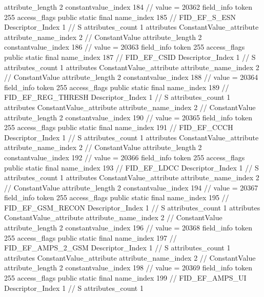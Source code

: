{{{{{{{					attribute_length	2
					constantvalue_index	184		// value = 20362
				}
				}
			}
			field_info {
				token	255
				access_flags	public static final
				name_index	185		// FID_EF_S_ESN
				Descriptor_Index	1		// S
				attributes_count	1
				attributes {
				ConstantValue_attribute {
					attribute_name_index	2		// ConstantValue
					attribute_length	2
					constantvalue_index	186		// value = 20363
				}
				}
			}
			field_info {
				token	255
				access_flags	public static final
				name_index	187		// FID_EF_CSID
				Descriptor_Index	1		// S
				attributes_count	1
				attributes {
				ConstantValue_attribute {
					attribute_name_index	2		// ConstantValue
					attribute_length	2
					constantvalue_index	188		// value = 20364
				}
				}
			}
			field_info {
				token	255
				access_flags	public static final
				name_index	189		// FID_EF_REG_THRESH
				Descriptor_Index	1		// S
				attributes_count	1
				attributes {
				ConstantValue_attribute {
					attribute_name_index	2		// ConstantValue
					attribute_length	2
					constantvalue_index	190		// value = 20365
				}
				}
			}
			field_info {
				token	255
				access_flags	public static final
				name_index	191		// FID_EF_CCCH
				Descriptor_Index	1		// S
				attributes_count	1
				attributes {
				ConstantValue_attribute {
					attribute_name_index	2		// ConstantValue
					attribute_length	2
					constantvalue_index	192		// value = 20366
				}
				}
			}
			field_info {
				token	255
				access_flags	public static final
				name_index	193		// FID_EF_LDCC
				Descriptor_Index	1		// S
				attributes_count	1
				attributes {
				ConstantValue_attribute {
					attribute_name_index	2		// ConstantValue
					attribute_length	2
					constantvalue_index	194		// value = 20367
				}
				}
			}
			field_info {
				token	255
				access_flags	public static final
				name_index	195		// FID_EF_GSM_RECON
				Descriptor_Index	1		// S
				attributes_count	1
				attributes {
				ConstantValue_attribute {
					attribute_name_index	2		// ConstantValue
					attribute_length	2
					constantvalue_index	196		// value = 20368
				}
				}
			}
			field_info {
				token	255
				access_flags	public static final
				name_index	197		// FID_EF_AMPS_2_GSM
				Descriptor_Index	1		// S
				attributes_count	1
				attributes {
				ConstantValue_attribute {
					attribute_name_index	2		// ConstantValue
					attribute_length	2
					constantvalue_index	198		// value = 20369
				}
				}
			}
			field_info {
				token	255
				access_flags	public static final
				name_index	199		// FID_EF_AMPS_UI
				Descriptor_Index	1		// S
				attributes_count	1
}}}}}

